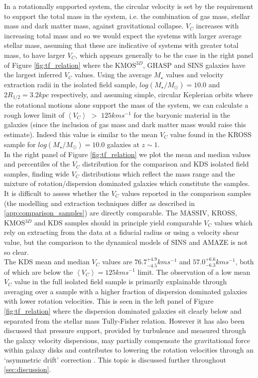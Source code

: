 \documentclass[fleqn,usenatbib]{mn2e}
\begin{document}
In a rotationally supported system, the circular velocity is set by the requirement to support the total mass in the system, i.e. the combination of gas mass, stellar mass and dark matter mass, against gravitational collapse.
$V_{C}$ increases with increasing total mass and so we would expect the systems with larger average stellar mass, assuming that these are indicative of systems with greater total mass, to have larger $V_{C}$, which appears generally to be the case in the right panel of Figure \ref{fig:tf_relation} where the KMOS$^{3D}$, GHASP and SINS galaxies have the largest inferred $V_{C}$ values.
Using the average $M_{\star}$ values and velocity extraction radii in the isolated field sample, $log(M_{\star}/M_{\odot})=10.0$ and $2R_{1/2} = 3.2kpc$ respectively, and assuming simple, circular Keplerian orbits where the rotational motions alone support the mass of the system, we can calculate a rough lower limit of $\left<V_{C}\right>$ $>$ $125kms^{-1}$ for the baryonic material in the galaxies (since the inclusion of gas mass and dark matter mass would raise this estimate).
Indeed this value is similar to the mean $V_{C}$ value found in the KROSS sample for $log(M_{\star}/M_{\odot})=10.0$ galaxies at $z\sim1$. \\

In the right panel of Figure \ref{fig:tf_relation} we plot the mean and median values and percentiles of the $V_{C}$ distribution for the comparison and KDS isolated field samples, finding wide $V_{C}$ distributions which reflect the mass range and the mixture of rotation/dispersion dominated galaxies which constitute the samples.
It is difficult to assess whether the $V_{C}$ values reported in the comparison samples (the modelling and extraction techniques differ as described in \cref{app:comparison_samples}) are directly comparable.
The MASSIV, KROSS, KMOS$^{3D}$ and KDS samples should in principle yield comparable $V_{C}$ values which rely on extracting from the data at a fiducial radius or using a velocity shear value, but the comparison to the dynamical models of SINS and AMAZE is not so clear. \\

The KDS mean and median $V_{C}$ values are $76.7^{+4.9}_{-4.5}kms^{-1}$ and $57.0^{+6.6}_{-6.3}kms^{-1}$, both of which are below the $\left<V_{C}\right> = 125kms^{-1}$ limit.
The observation of a low mean $V_{C}$ value in the full isolated field sample is primarily explainable through averaging over a sample with a higher fraction of dispersion dominated galaxies with lower rotation velocities.
This is seen in the left panel of Figure \ref{fig:tf_relation} where the dispersion dominated galaxies sit clearly below and separated from the stellar mass Tully-Fisher relation.
However it has also been discussed that pressure support, provided by turbulence and measured through the galaxy velocity dispersions, may partially compensate the gravitational force within galaxy disks and contributes to lowering the rotation velocities through an `asymmetric drift' correction \citep[e.g.][]{Burkert2010,Newman2013,Genzel2017}.
This topic is discussed further throughout \cref{sec:discussion}. 
\end{document}
